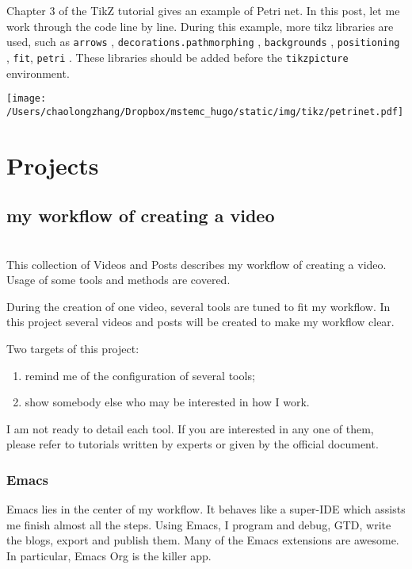 Chapter 3 of the TikZ tutorial gives an example of Petri net. In this post, let
me work through the code line by line. During this example, more tikz libraries
are used, such as \texttt{arrows} , \texttt{decorations.pathmorphing} , \texttt{backgrounds} ,
\texttt{positioning} , \texttt{fit}, \texttt{petri} . These libraries should be added before the
\texttt{tikzpicture} environment.

\begin{center}
\texttt{[image: /Users/chaolongzhang/Dropbox/mstemc\_hugo/static/img/tikz/petrinet.pdf]}
\end{center}



\section{Projects}
\label{sec:orgaf97de2}


\subsection{my workflow of creating a video}
\label{sec:org45aac98}
\hspace{0pt}\\


This collection of Videos and Posts describes my workflow of creating a video. Usage of some tools and methods are covered.


During the creation of one video, several tools are tuned to fit my workflow. In
this project several videos and posts will be created to make my workflow clear.

Two targets of this project:
\begin{enumerate}
\item remind me of the configuration of several tools;
\item show somebody else who may be interested in how I work.
\end{enumerate}

I am not ready to detail each tool. If you are interested in any one of them,
please refer to tutorials written by experts or given by the official document.

\subsubsection{Emacs}
\label{sec:orgcb16fe3}


Emacs lies in the center of my workflow. It behaves like a super-IDE which
assists me finish almost all the steps. Using Emacs, I program and debug, GTD,
write the blogs, export and publish them. Many of the Emacs extensions are
awesome. In particular, Emacs Org is the killer app.

